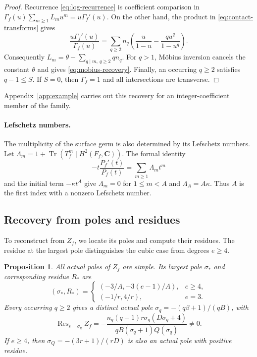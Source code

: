 \documentclass[11pt]{article}
\numberwithin{equation}{section}
\newtheorem{proposition}[theorem]{Proposition}
\theoremstyle{definition}
\theoremstyle{remark}
\newcommand{\CC}{\mathbf C}
\DeclareMathOperator{\Res}{Res}
\DeclareMathOperator{\Tr}{Tr}
\begin{document}
\begin{proof}
Recurrence \eqref{eq:log-recurrence} is coefficient comparison
in
$\Gamma_f(u)\sum_{m\ge1}L_m u^m=u\Gamma_f'(u)$.
On the other hand, the product in \eqref{eq:contact-transforms}
gives
\[
 \frac{u\Gamma_f'(u)}{\Gamma_f(u)}
   =\sum_{q\ge2}n_q
       \left(\frac{u}{1-u}-\frac{q u^q}{1-u^q}\right).
\]
Consequently
$L_m=\theta-\sum_{q\mid m,\ q\ge2}qn_q$.
For $q>1$, M\"obius inversion cancels the constant $\theta$
and gives \eqref{eq:mobius-recovery}. Finally, an occurring
$q\ge2$ satisfies $q-1\le S$. If $S=0$, then $\Gamma_f=1$
and all intersections are transverse.
\end{proof}

Appendix~\ref{app:example} carries out this recovery for an
integer-coefficient member of the family.

\paragraph{Lefschetz numbers.}
The multiplicity of the surface germ is also determined by
its Lefschetz numbers. Let
$\Lambda_m=1+\Tr(T_f^m\mid H^2(F_f,\CC))$. The formal identity
\[
 -t\frac{P_f'(t)}{P_f(t)}
       =\sum_{m\ge1}\Lambda_m t^m
\]
and the initial term $-\kappa t^A$ give
$\Lambda_m=0$ for $1\le m<A$ and $\Lambda_A=A\kappa$.
Thus $A$ is the first index with a nonzero Lefschetz number.

\subsection{Recovery from poles and residues}

To reconstruct from $Z_f$, we locate its poles and compute
their residues. The residue at the largest pole distinguishes
the cubic case from degrees $e\ge4$.

\begin{proposition}\label{prop:poles}
All actual poles of $Z_f$ are simple. Its largest pole
$\sigma_*$ and corresponding residue $R_*$ are
\begin{equation}\label{eq:largest-pole}
 (\sigma_*,R_*)=
 \begin{cases}
  (-3/A,-3(e-1)/A),&e\ge4,\\
  (-1/r,4/r),&e=3.
 \end{cases}
\end{equation}
Every occurring $q\ge2$ gives a distinct actual pole
$\sigma_q=-(q\beta+1)/(qB)$, with
\begin{equation}\label{eq:contact-residue}
 \Res_{s=\sigma_q}Z_f
  =-\frac{n_q(q-1)r\sigma_q(D\sigma_q+4)}
          {qB(\sigma_q+1)Q(\sigma_q)}\ne0.
\end{equation}
If $e\ge4$, then $\sigma_Q=-(3r+1)/(rD)$ is also an actual
pole with positive residue.
\end{proposition}
\end{document}

